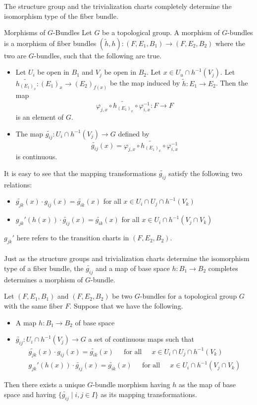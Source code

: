 \documentclass[a4paper]{article}
\begin{document}
The structure group and the trivialization charts completely determine the isomorphism type of the fiber bundle. 

\begin{defn}{Morphisms of $G$-Bundles}{} Let $G$ be a topological group. A morphism of $G$-bundles is a morphism of fiber bundles $(\tilde{h},h):(F,E_1,B_1)\to(F,E_2,B_2)$ where the two are $G$-bundles, such that the following are true. 
\begin{itemize}
\item Let $U_i$ be open in $B_1$ and $V_j$ be open in $B_2$. Let $x\in U_u\cap h^{-1}(V_j)$. Let $\widetilde{h_{(E_1)_x}}:(E_1)_x\to(E_2)_{f(x)}$ be the map induced by $\tilde{h}:E_1\to E_2$. Then the map $$\varphi_{j,x}\circ\widetilde{h_{(E_1)_x}}\circ\varphi_{i,x}^{-1}:F\to F$$ is an element of $G$. 
\item The map $\widetilde{g_{ij}}:U_i\cap h^{-1}(V_j)\to G$ defined by $$\widetilde{g_{ij}}(x)=\varphi_{j,x}\circ\widetilde{h_{(E_1)_x}}\circ\varphi_{i,x}^{-1}$$ is continuous. 
\end{itemize}
\end{defn}

It is easy to see that the mapping transformations $\widetilde{g_{ij}}$ satisfy the following two relations: 
\begin{itemize}
\item $\widetilde{g_{jk}}(x)\cdot g_{ij}(x)=\widetilde{g_{ik}}(x)$ for all $x\in U_i\cap U_j\cap h^{-1}(V_k)$
\item $g_{jk}'(h(x))\cdot\widetilde{g_{ij}}(x)=\widetilde{g_{ik}}(x)$ for all $x\in U_i\cap h^{-1}(V_j\cap V_k)$
\end{itemize}

$g_{jk}'$ here refers to the transition charts in $(F,E_2,B_2)$. \\~\\

Just as the structure groups and trivialization charts determine the isomorphism type of a fiber bundle, the $\widetilde{g_{ij}}$ and a map of base space $h:B_1\to B_2$ completes determines a morphism of $G$-bundle. 

\begin{lmm}{}{} Let $(F,E_1,B_1)$ and $(F,E_2,B_2)$ be two $G$-bundles for a topological group $G$ with the same fiber $F$. Suppose that we have the following. 
\begin{itemize}
\item A map $h:B_1\to B_2$ of base space
\item $\widetilde{g_{ij}}:U_i\cap h^{-1}(V_j)\to G$ a set of continuous maps such that \begin{gather*}
\widetilde{g_{jk}}(x)\cdot g_{ij}(x)=\widetilde{g_{ik}}(x)\;\;\;\;\text{ for all }\;\;\;\;x\in U_i\cap U_j\cap h^{-1}(V_k)\\
g_{jk}'(h(x))\cdot\widetilde{g_{ij}}(x)=\widetilde{g_{ik}}(x)\;\;\;\;\text{ for all }\;\;\;\;x\in U_i\cap h^{-1}(V_j\cap V_k)
\end{gather*}
\end{itemize}
Then there exists a unique $G$-bundle morphism having $h$ as the map of base space and having $\{\widetilde{g_{ij}}\;|\;i,j\in I\}$ as its mapping transformations. 
\end{lmm}
\end{document}
